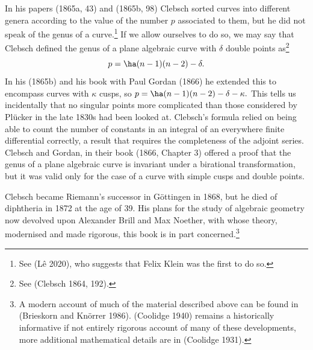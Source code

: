                                                                                                                                                                                                                                                                                                                                                                                                                                                                                                                                                                                                                                                                                                                                                                                                                                                                                                                                                                                                                                                                                                            
In his papers (1865a, 43) and (1865b, 98) Clebsch sorted curves into different genera according to the value of the number $p$ associated to them, but he did not speak of the genus of a curve.\footnote{See (L\^e 2020), who suggests that Felix Klein was the first to do so.} If we allow ourselves to do so, we may say that Clebsch defined the genus of a plane algebraic curve with $\delta$ double points as\footnote{See (Clebsch 1864, 192).} 
$$p = \ha (n-1)(n-2) - \delta.$$
In his (1865b) and his book with Paul Gordan (1866) he extended this to encompass curves with 
$\kappa$ cusps, so $p= \ha (n-1)(n-2) - \delta - \kappa.$ This tells us incidentally that no singular points more complicated than those considered by Pl\"ucker in the late 1830s had been looked at. Clebsch's formula relied on being able to count the number of constants in an integral of an everywhere finite differential correctly, a result that requires the  completeness of the adjoint series. Clebsch and Gordan, in their book (1866, Chapter 3) offered a proof that the genus of a plane algebraic curve is invariant under a birational transformation, but it was valid only for the case of a curve with simple cusps and double points. 


Clebsch became   Riemann's successor in G\"ottingen in 1868, but  he died of diphtheria in 1872 at the age of 39. His plans for the study of algebraic geometry now devolved upon Alexander Brill and Max Noether, with whose theory, modernised and made rigorous,  this book is in part concerned.\footnote{A modern account of  much of the material described above can be found in (Brieskorn and Kn\"orrer 1986). (Coolidge 1940) remains a historically informative if not entirely rigorous account of many of these developments, more additional mathematical details are in (Coolidge 1931).}

